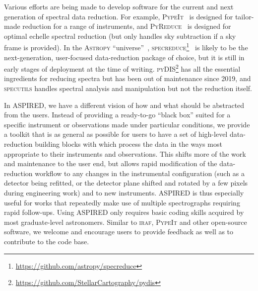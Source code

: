 \documentclass[linenumbers, twocolumn]{aastex631}
\begin{document}
Various efforts are being made to develop software for the current and
next generation of spectral data reduction. For example,
\textsc{PypeIt}~\citep{pypeit:zenodo, 2020JOSS....5.2308P} is designed for
tailor-made reduction for a range of instruments, and
\textsc{PyReduce}~\citep{2021A&A...646A..32P} is designed for optimal echelle
spectral reduction (but only handles sky subtraction if a sky frame is provided).
In the \textsc{Astropy} ``universe''~\citep{astropy:2013, astropy:2018},
\textsc{specreduce}\footnote{\url{https://github.com/astropy/specreduce}}~\citep{pickering_timothy_2022_7007991} is likely to be the
next-generation, user-focused data-reduction package of choice, but it is still in early
stages of deployment at the time of writing.
\textsc{pyDIS}\footnote{\url{https://github.com/StellarCartography/pydis}} has
all the essential ingredients for reducing spectra but has been out of
maintenance since 2019, and \textsc{specutils}
handles spectral analysis and manipulation but not the reduction itself.

In \textsc{ASPIRED}, we have a different vision of how and what should be
abstracted from the users. Instead of providing a ready-to-go ``black box''
suited for a specific instrument or observations made under particular conditions,
we provide a toolkit that is as general as possible for users to have a set of
high-level data-reduction building blocks with which process the data in the ways most
appropriate to their instruments and observations. This shifts more of the work
and maintenance to the user end, but allows rapid modification of the
data-reduction workflow to any changes in the instrumental
configuration (such as a detector being refitted, or the detector plane
shifted and rotated by a few pixels during engineering work) and to new instruments. \textsc{ASPIRED}
is thus especially useful for works that repeatedly make use of multiple
spectrographs requiring rapid follow-ups.
Using \textsc{ASPIRED} only requires basic coding skills acquired by most
graduate-level astronomers. Similar to \textsc{iraf},
\textsc{PypeIt} and other open-source software, we welcome and encourage users
to provide feedback as well as to contribute to the code base.
\end{document}
